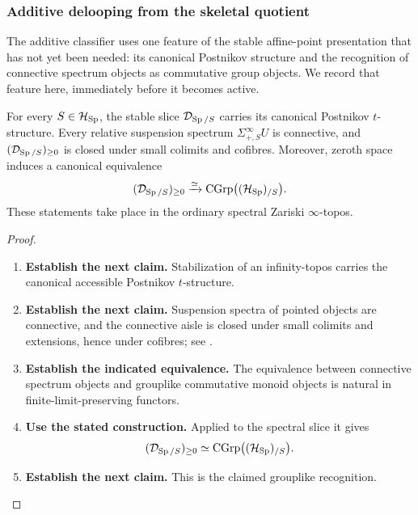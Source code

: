 \subsubsection{Additive delooping from the skeletal quotient}
\label{subsec:skeletal-delooping-closed-forms}

The additive classifier uses one feature of the stable affine-point
presentation that has not yet been needed: its canonical Postnikov structure
and the recognition of connective spectrum objects as commutative group
objects. We record that feature here, immediately before it becomes active.

\begin{proposition}
\label{prop:stable-slice-postnikov-grouplike}
For every \(S\in\mathcal H_{\operatorname{Sp}}\), the stable slice
\(\mathcal D_{\operatorname{Sp}/S}\) carries its canonical Postnikov \(t\)-structure. Every
relative suspension spectrum \(\Sigma^\infty_{+,S}U\) is connective, and
\((\mathcal D_{\operatorname{Sp}/S})_{\geq0}\) is closed under small colimits and cofibres.
Moreover, zeroth space induces a canonical equivalence
\[
    (\mathcal D_{\operatorname{Sp}/S})_{\geq0}
    \xrightarrow{\simeq}
    \operatorname{CGrp}\bigl((\mathcal H_{\operatorname{Sp}})_{/S}\bigr).
  \]
These statements take place in the ordinary spectral Zariski \(\infty\)-topos.
\end{proposition}

\begin{proof}
\leavevmode
\begin{enumerate}[label=\textup{(\arabic*)}]
    \item \textbf{Establish the next claim.}
    Stabilization of an infinity-topos carries the canonical accessible Postnikov
    \(t\)-structure.
    \item \textbf{Establish the next claim.}
    Suspension spectra of pointed objects are connective, and
    the connective aisle is closed under small colimits and extensions, hence
    under cofibres; see \cite{LurieHigherAlgebra,LurieSAG}.
    \item \textbf{Establish the indicated equivalence.}
    The equivalence between
    connective spectrum objects and grouplike commutative monoid objects is natural
    in finite-limit-preserving functors.
    \item \textbf{Use the stated construction.}
    Applied to the spectral slice it gives
    \[
    (\mathcal D_{\operatorname{Sp}/S})_{\geq0}
    \simeq
    \operatorname{CGrp}\bigl((\mathcal H_{\operatorname{Sp}})_{/S}\bigr).
    \]
    \item \textbf{Establish the next claim.}
    This is the claimed grouplike recognition.
\end{enumerate}
\end{proof}

